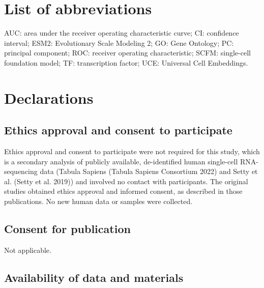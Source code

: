 \documentclass[
  11pt,
]{article}
\begin{document}
\section{List of abbreviations}\label{list-of-abbreviations}

AUC: area under the receiver operating characteristic curve; CI:
confidence interval; ESM2: Evolutionary Scale Modeling 2; GO: Gene
Ontology; PC: principal component; ROC: receiver operating
characteristic; SCFM: single-cell foundation model; TF: transcription
factor; UCE: Universal Cell Embeddings.

\section{Declarations}\label{declarations}

\subsection{Ethics approval and consent to
participate}\label{ethics-approval-and-consent-to-participate}

Ethics approval and consent to participate were not required for this
study, which is a secondary analysis of publicly available,
de-identified human single-cell RNA-sequencing data (Tabula Sapiens
(Tabula Sapiens Consortium 2022) and Setty et al. (Setty et al. 2019))
and involved no contact with participants. The original studies obtained
ethics approval and informed consent, as described in those
publications. No new human data or samples were collected.

\subsection{Consent for publication}\label{consent-for-publication}

Not applicable.

\subsection{Availability of data and
materials}\label{availability-of-data-and-materials}
\end{document}
